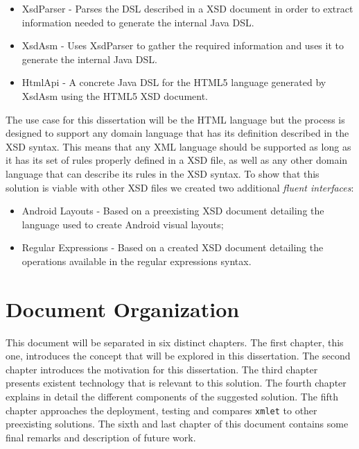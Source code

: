 \begin{itemize}
	\item XsdParser - Parses the \ac{DSL} described in a \ac{XSD} document in order to extract information needed to generate the internal Java \ac{DSL}.
	\item XsdAsm - Uses XsdParser to gather the required information and uses it to generate the internal Java \ac{DSL}.
	\item HtmlApi - A concrete Java \ac{DSL} for the \ac{HTML}5 language generated by XsdAsm using the \ac{HTML}5 \ac{XSD} document.
\end{itemize}

\noindent
The use case for this dissertation will be the \ac{HTML} language but the process is designed to support any domain language that has its definition described in the \ac{XSD} syntax. This means that any \ac{XML} language should be supported as long as it has its set of rules properly defined in a \ac{XSD} file, as well as any other domain language that can describe its rules in the \ac{XSD} syntax. To show that this solution is viable with other \ac{XSD} files we created two additional \textit{fluent interfaces}: 

\begin{itemize}
	\item Android Layouts - Based on a preexisting \ac{XSD} document detailing the language used to create Android visual layouts;
	\item Regular Expressions - Based on a created \ac{XSD} document detailing the operations available in the regular expressions syntax.
\end{itemize}

\section{Document Organization}

This document will be separated in six distinct chapters. The first chapter, this one, introduces the concept that will be explored in this dissertation. The second chapter introduces the motivation for this dissertation. The third chapter presents existent technology that is relevant to this solution. The fourth chapter explains in detail the different components of the suggested solution. The fifth chapter approaches the deployment, testing and compares \texttt{xmlet} to other preexisting solutions. The sixth and last chapter of this document contains some final remarks and description of future work.
